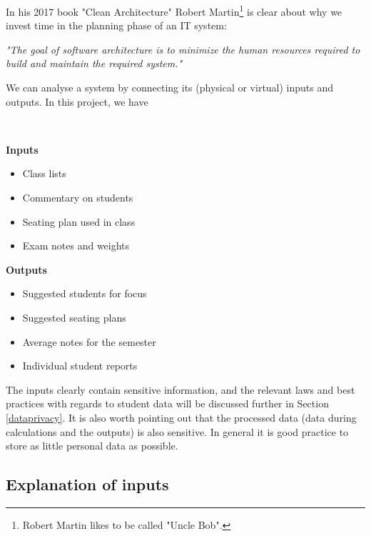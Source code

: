 \documentclass[10pt]{article}
\begin{document}
In his 2017 book "Clean Architecture" Robert Martin\footnote{Robert Martin likes to be called "Uncle Bob".} is clear about why we invest time in the planning phase of an IT system:
\begin{center}
\emph{"The goal of software architecture is to minimize the human resources required to build and maintain the required system."} \cite[p. 5]{Mart17}
\end{center}


We can analyse a system by connecting its (physical or virtual) inputs and outputs. In this project, we have

\

\begin{minipage}[t]{0.38\textwidth}

\textbf{Inputs}

\begin{itemize}
\item Class lists
\item Commentary on students
\item Seating plan used in class
\item Exam notes and weights
\end{itemize}


\end{minipage}
\hfill
\vline
\hfill
\begin{minipage}[t]{0.48\textwidth}

\textbf{Outputs}

\begin{itemize}
\item Suggested students for focus
\item Suggested seating plans
\item Average notes for the semester
\item Individual student reports
\end{itemize}

\end{minipage}

\vspace{5mm}

The inputs clearly contain sensitive information, and the relevant laws and best practices with regards to student data will be discussed further in Section \ref{dataprivacy}. It is also worth pointing out that the processed data (data during calculations and the outputs) is also sensitive. In general it is good practice to store as little personal data as possible.

\subsection{Explanation of inputs}
\end{document}
